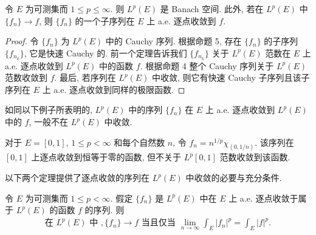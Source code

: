 \documentclass[../../main.tex]{subfiles}
\begin{document}
\begin{theorem}\label{theorem:ch07-Riesz-Fischer}
令 $E$ 为可测集而 $1\leqslant p\leqslant\infty$. 则 $L^{p}(E)$ 是 Banach 空间. 此外, 若在 $L^{p}(E)$ 中 $\{f_{n}\}\to f$, 则 $\{f_{n}\}$ 的一个子序列在 $E$ 上 a.e. 逐点收敛到 $f$.
\end{theorem}

\begin{proof}
令 $\{f_{n}\}$ 为 $L^{p}(E)$ 中的 Cauchy 序列. 根据命题 5, 存在 $\{f_{n}\}$ 的子序列 $\{f_{n_{k}}\}$, 它是快速 Cauchy 的. 前一个定理告诉我们 $\{f_{n_{k}}\}$ 关于 $L^{p}(E)$ 范数在 $E$ 上 a.e. 逐点收敛到 $L^{p}(E)$ 中的函数 $f$. 根据命题 4 整个 Cauchy 序列关于 $L^{p}(E)$ 范数收敛到 $f$. 最后, 若序列在 $L^{p}(E)$ 中收敛, 则它有快速 Cauchy 子序列且该子序列在 $E$ 上 a.e. 逐点收敛到同样的极限函数.
\end{proof}

如同以下例子所表明的, $L^{p}(E)$ 中的序列 $\{f_{n}\}$ 在 $E$ 上 a.e. 逐点收敛到 $L^{p}(E)$ 中的 $f$, 一般不在 $L^{p}(E)$ 中收敛.

\begin{example}\label{example:ch07-逐点不收敛}
对于 $E=[0,1]$, $1\leqslant p<\infty$ 和每个自然数 $n$, 令 $f_{n}=n^{1/p}\chi_{(0,1/n)}$. 该序列在 $[0,1]$ 上逐点收敛到恒等于零的函数, 但不关于 $L^{p}[0,1]$ 范数收敛到该函数.
\end{example}

以下两个定理提供了逐点收敛的序列在 $L^{p}(E)$ 中收敛的必要与充分条件.

\begin{theorem}\label{theorem:ch07-范数收敛等价}
令 $E$ 为可测集而 $1\leqslant p<\infty$. 假定 $\{f_{n}\}$ 是 $L^{p}(E)$ 中在 $E$ 上 a.e. 逐点收敛于属于 $L^{p}(E)$ 的函数 $f$ 的序列. 则
\begin{align*}
\text{在 }L^{p}(E)\text{ 中 },\{f_{n}\}\to f\text{ 当且仅当 }\lim_{n\to\infty}\int_{E}|f_{n}|^{p}=\int_{E}|f|^{p}.
\end{align*}
\end{theorem}
\end{document}
